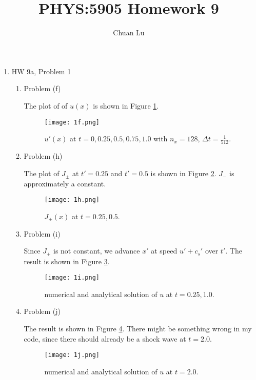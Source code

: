 \documentclass{article}
\begin{document}
\author{Chuan Lu}
\title{PHYS:5905 Homework 9}
\maketitle

\medskip

\begin{enumerate}

\item HW 9a, Problem 1

\begin{enumerate}
\item Problem (f)

The plot of of $u(x)$ is shown in Figure \ref{Problem 1(f)}.

\begin{figure}[ht]
\centering
\texttt{[image: 1f.png]}
\caption{$u'(x) $ at $t = 0, 0.25, 0.5, 0.75, 1.0$ with $n_x = 128 $, $\Delta t = \frac{1}{512}$.}
\label{Problem 1(f)}
\end{figure}

\item Problem (h)

The plot of $J_{\pm} $ at $t' = 0.25$ and $t' = 0.5$ is shown in Figure \ref{Problem 1(h)}. $J_{-} $ is approximately a constant.

\begin{figure}[ht]
\centering
\texttt{[image: 1h.png]}
\caption{$J_{\pm}(x) $ at $t = 0.25, 0.5$.}
\label{Problem 1(h)}
\end{figure}

\item Problem (i)

Since $J_{+} $ is not constant, we advance $x'$ at speed $u'+c_s' $ over $t'$. The result is shown in Figure \ref{Problem 1(i)}.

\begin{figure}[ht]
\centering
\texttt{[image: 1i.png]}
\caption{numerical and analytical solution of $u $ at $t = 0.25, 1.0$.}
\label{Problem 1(i)}
\end{figure}

\item Problem (j)

The result is shown in Figure \ref{Problem 1(j)}. There might be something wrong in my code, since there should already be a shock wave at $t = 2.0$.

\begin{figure}[ht]
\centering
\texttt{[image: 1j.png]}
\caption{numerical and analytical solution of $u $ at $t = 2.0$.}
\label{Problem 1(j)}
\end{figure}

\end{enumerate}



\end{enumerate}
\end{document}
